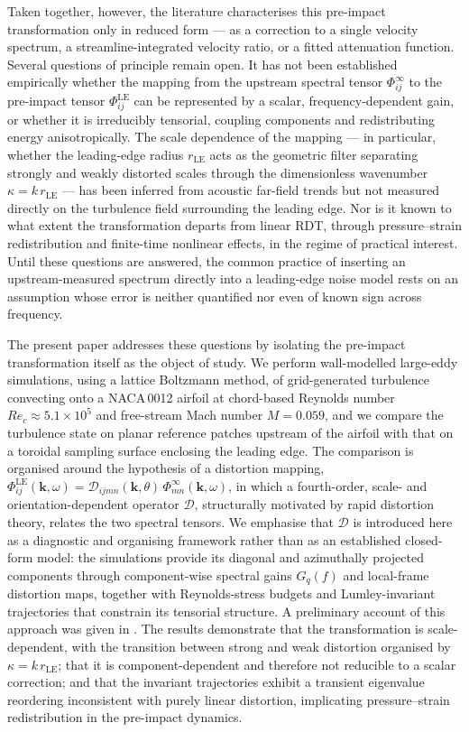 \documentclass[lineno]{JFM-FLM_Au}
\begin{document}
Taken together, however, the literature characterises this pre-impact
transformation only in reduced form — as a correction to a single velocity
spectrum, a streamline-integrated velocity ratio, or a fitted attenuation
function. Several questions of principle remain open. It has not been
established empirically whether the mapping from the upstream spectral
tensor $\Phi^{\infty}_{ij}$ to the pre-impact tensor $\Phi^{\mathrm{LE}}_{ij}$
can be represented by a scalar, frequency-dependent gain, or whether it is
irreducibly tensorial, coupling components and redistributing energy
anisotropically. The scale dependence of the mapping — in particular,
whether the leading-edge radius $r_{\mathrm{LE}}$ acts as the geometric
filter separating strongly and weakly distorted scales through the
dimensionless wavenumber $\kappa = k\,r_{\mathrm{LE}}$ — has been inferred
from acoustic far-field trends \citep{Gill2013,DevenportStaubsGlegg2010} but
not measured directly on the turbulence field surrounding the leading edge.
Nor is it known to what extent the transformation departs from linear RDT,
through pressure--strain redistribution and finite-time nonlinear effects,
in the regime of practical interest. Until these questions are answered,
the common practice of inserting an upstream-measured spectrum directly into
a leading-edge noise model rests on an assumption whose error is neither
quantified nor even of known sign across frequency.

The present paper addresses these questions by isolating the pre-impact
transformation itself as the object of study. We perform wall-modelled
large-eddy simulations, using a lattice Boltzmann method, of grid-generated
turbulence convecting onto a NACA\,0012 airfoil at chord-based Reynolds
number $Re_c \approx 5.1\times10^{5}$ and free-stream Mach number
$M = 0.059$, and we compare the turbulence state on planar reference patches
upstream of the airfoil with that on a toroidal sampling surface enclosing
the leading edge. The comparison is organised around the hypothesis of a
distortion mapping,
$\Phi^{\mathrm{LE}}_{ij}(\boldsymbol{k},\omega)
 = \mathcal{D}_{ijmn}(\boldsymbol{k},\theta)\,
   \Phi^{\infty}_{mn}(\boldsymbol{k},\omega)$,
in which a fourth-order, scale- and orientation-dependent operator
$\mathcal{D}$, structurally motivated by rapid distortion theory, relates
the two spectral tensors. We emphasise that $\mathcal{D}$ is introduced
here as a diagnostic and organising framework rather than as an established
closed-form model: the simulations provide its diagonal and azimuthally
projected components through component-wise spectral gains $G_q(f)$ and
local-frame distortion maps, together with Reynolds-stress budgets and
Lumley-invariant trajectories that constrain its tensorial structure. A
preliminary account of this approach was given in
\citet{Sharma2026}. The results demonstrate that the transformation is
scale-dependent, with the transition between strong and weak distortion
organised by $\kappa = k\,r_{\mathrm{LE}}$; that it is component-dependent
and therefore not reducible to a scalar correction; and that the invariant
trajectories exhibit a transient eigenvalue reordering inconsistent with
purely linear distortion, implicating pressure--strain redistribution in the
pre-impact dynamics.
\end{document}
